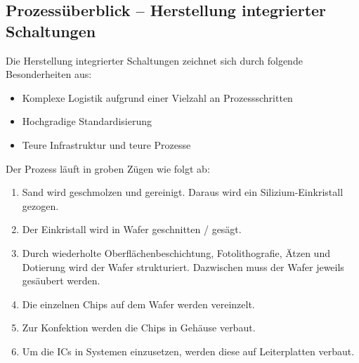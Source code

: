 \subsection{Prozessüberblick -- Herstellung integrierter Schaltungen}
Die Herstellung integrierter Schaltungen zeichnet sich durch folgende Besonderheiten aus:
\begin{itemize}
    \item Komplexe Logistik aufgrund einer Vielzahl an Prozessschritten
    \item Hochgradige Standardisierung
    \item Teure Infrastruktur und teure Prozesse
\end{itemize}

\smallskip

Der Prozess läuft in groben Zügen wie folgt ab:
\begin{enumerate}
    \item Sand wird geschmolzen und gereinigt. Daraus wird ein Silizium-Einkristall gezogen.
    \item Der Einkristall wird in Wafer geschnitten / gesägt.
    \item Durch wiederholte Oberflächenbeschichtung, Fotolithografie, Ätzen und Dotierung wird der Wafer strukturiert. Dazwischen muss der Wafer jeweils gesäubert werden.
    \item Die einzelnen Chips auf dem Wafer werden vereinzelt.
    \item Zur Konfektion werden die Chips in Gehäuse verbaut.
    \item Um die ICs in Systemen einzusetzen, werden diese auf Leiterplatten verbaut.
\end{enumerate}

\medskip


